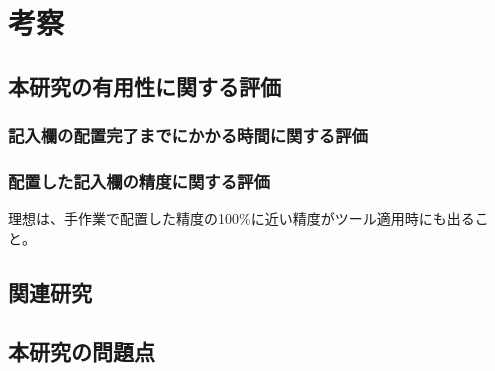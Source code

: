 \chapter{考察}\label{cha:Discussion}



\section{本研究の有用性に関する評価}\label{sec:evalue_usefulness}

\subsection{記入欄の配置完了までにかかる時間に関する評価}\label{subsec:evalue_required_time}

\subsection{配置した記入欄の精度に関する評価}\label{subsec:evalue_accuracy}
理想は、手作業で配置した精度の100\%に近い精度がツール適用時にも出ること。



\section{関連研究}\label{sec:relation_research}



\section{本研究の問題点}\label{sec:AWSEL_problems}